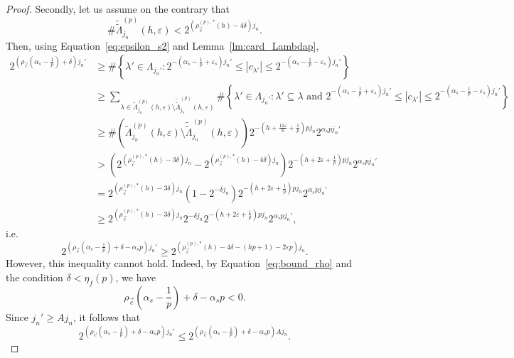 \documentclass[a4paper,11pt,oneside]{article}
\newcommand{\modu}[1]{\left\vert{#1}\right\vert}
\theoremstyle{definition}
\theoremstyle{plain}
\begin{document}
\begin{proof}
    Secondly, let us assume on the contrary that 
    \[
    \#\widetilde{\widetilde{\Lambda}}_{j_n}^{(p)}(h,\varepsilon) < 2^{\left(\rho_{\vec{c}}^{(p),\ast}(h)-4\delta\right)j_n}.
    \]
    Then, using Equation~\eqref{eq:epsilon_s2} and Lemma~\ref{lm:card_Lambdap},
    \begin{align*}
        2^{\left(\rho_{\vec{c}}\left(\alpha_s-\frac{1}{p}\right)+\delta\right)j_n'} 
        & \geq \#\left\{\lambda'\in\Lambda_{j_n'} :2^{-\left(\alpha_s-\frac{1}{p}+\varepsilon_s\right)j_n'} \leq \modu{c_{\lambda'}} \leq 2^{-\left(\alpha_s-\frac{1}{p}-\varepsilon_s\right)j_n'}\right\} \\
        & \geq \sum_{\lambda\in\widetilde{\Lambda}_{j_n}^{(p)}(h,\varepsilon)\setminus\widetilde{\widetilde{\Lambda}}_{j_n}^{(p)}(h,\varepsilon)}\#\left\{\lambda'\in\Lambda_{j_n'} :\lambda'\subseteq\lambda \text{ and } 2^{-\left(\alpha_s-\frac{1}{p}+\varepsilon_s\right)j_n'} \leq \modu{c_{\lambda'}} \leq 2^{-\left(\alpha_s-\frac{1}{p}-\varepsilon_s\right)j_n'}\right\} \\
        & \geq \#\left(\widetilde{\Lambda}_{j_n}^{(p)}(h,\varepsilon)\setminus\widetilde{\widetilde{\Lambda}}_{j_n}^{(p)}(h,\varepsilon)\right)2^{-\left(h+\frac{11\varepsilon}{6}+\frac{1}{p}\right)pj_n}2^{\alpha_spj_n'} \\
        & > \left(2^{\left(\rho_{\vec{c}}^{(p),\ast}(h)-3\delta\right)j_n}-2^{\left(\rho_{\vec{c}}^{(p),\ast}(h)-4\delta\right)j_n}\right)2^{-\left(h+2\varepsilon+\frac{1}{p}\right)pj_n}2^{\alpha_spj_n'} \\
        & = 2^{\left(\rho_{\vec{c}}^{(p),\ast}(h)-3\delta\right)j_n}\left(1-2^{-\delta j_n}\right)2^{-\left(h+2\varepsilon+\frac{1}{p}\right)pj_n}2^{\alpha_spj_n'} \\
        & \geq 2^{\left(\rho_{\vec{c}}^{(p),\ast}(h)-3\delta\right)j_n}2^{-\delta j_n}2^{-\left(h+2\varepsilon+\frac{1}{p}\right)pj_n}2^{\alpha_spj_n'},
    \end{align*}
    i.e.
    \[
    2^{\left(\rho_{\vec{c}}\left(\alpha_s-\frac{1}{p}\right)+\delta-\alpha_sp\right)j_n'} \geq 2^{\left(\rho_{\vec{c}}^{(p),\ast}(h)-4\delta-(hp+1)-2\varepsilon p\right)j_n}.
    \]
    However, this inequality cannot hold. Indeed, by Equation~\eqref{eq:bound_rho}
and the condition $\delta<\eta_f(p)$, we have
\[
\rho_{\vec{c}}\left(\alpha_s-\frac{1}{p}\right)
+\delta-\alpha_sp<0.
\]
Since $j_n'\geq Aj_n$, it follows that
\[
2^{\left(\rho_{\vec{c}}\left(\alpha_s-\frac{1}{p}\right)
+\delta-\alpha_sp\right)j_n'}
\leq
2^{\left(\rho_{\vec{c}}\left(\alpha_s-\frac{1}{p}\right)
+\delta-\alpha_sp\right)Aj_n}.
\]
\end{proof}
\end{document}
